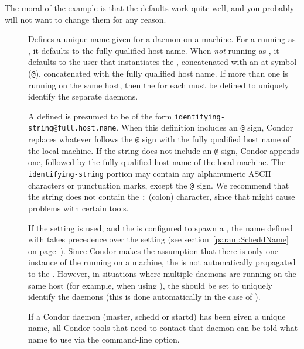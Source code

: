 The moral of the example is that 
the defaults work quite well, and you probably 
will not want to change them for any reason.
\begin{description}

\item[] \label{param:MasterName}
  Defines a unique name given for a  daemon on a machine.
  For a  running as ,
  it defaults to the fully qualified host name.
  When \emph{not} running as ,
  it defaults to the user that instantiates the
  , concatenated with an at symbol (\verb$@$),
  concatenated with the fully qualified host name.
  If more than one  is running on the same host, 
  then the  for each
   must be defined to uniquely identify the separate
  daemons. 

  A defined  is presumed to be of the form
  \verb$identifying-string@full.host.name$.
  When this definition includes
  an \verb$@$ sign, Condor replaces whatever follows the \verb$@$
  sign with the fully qualified host name of the local machine.
  If the string does not include an \verb$@$ sign,
  Condor appends one, followed by the fully qualified host name
  of the local machine.
  The \verb$identifying-string$ portion may contain any
  alphanumeric ASCII characters or punctuation marks, except the \verb$@$ sign.
  We recommend that the string does not contain the \verb$:$ (colon)
  character, since that might cause problems with certain tools.

  If the  setting is used, and the
   is configured to spawn a ,
  the name
  defined with  takes precedence over the
   setting (see section~\ref{param:ScheddName} on
  page~\pageref{param:ScheddName}). 
  Since Condor makes the assumption that there is only one
  instance of the  running on a machine,
  the  is not automatically propagated to the
  .
  However, in situations where multiple  daemons are
  running on the same host (for example, when using ),
  the  should be set to uniquely identify 
  the  daemons
  (this is done automatically in the case of ).

  If a Condor daemon (master, schedd or startd) has been given a
  unique name, all Condor tools that need to contact that daemon can
  be told what name to use via the  command-line option.



\end{description}
